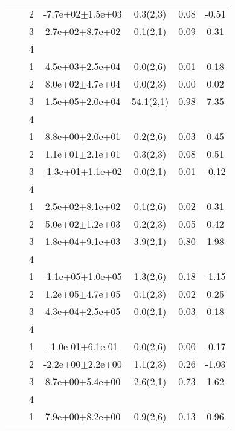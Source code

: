 \begin{longtable}[H]{llccccS[table-format=-2.2, table-space-text-post = {***}]}
   &  & 2 & -7.7e+02$\pm$1.5e+03 & 0.3(2,3) & 0.08 & -0.51 \\* 
   &  & 3 &  2.7e+02$\pm$8.7e+02 & 0.1(2,1) & 0.09 & 0.31 \\* 
   &  & 4 &  &  &  &  \\
   \midrule
{} & {} & 1 &  4.5e+03$\pm$2.5e+04 & 0.0(2,6) & 0.01 & 0.18 \\* 
   &  & 2 &  8.0e+02$\pm$4.7e+04 & 0.0(2,3) & 0.00 & 0.02 \\* 
   &  & 3 &  1.5e+05$\pm$2.0e+04 & 54.1(2,1) & 0.98 & 7.35 \\* 
   &  & 4 &  &  &  &  \\
   \midrule
{} & {} & 1 &  8.8e+00$\pm$2.0e+01 & 0.2(2,6) & 0.03 & 0.45 \\* 
   &  & 2 &  1.1e+01$\pm$2.1e+01 & 0.3(2,3) & 0.08 & 0.51 \\* 
   &  & 3 & -1.3e+01$\pm$1.1e+02 & 0.0(2,1) & 0.01 & -0.12 \\* 
   &  & 4 &  &  &  &  \\
   \midrule
{} & {} & 1 &  2.5e+02$\pm$8.1e+02 & 0.1(2,6) & 0.02 & 0.31 \\* 
   &  & 2 &  5.0e+02$\pm$1.2e+03 & 0.2(2,3) & 0.05 & 0.42 \\* 
   &  & 3 &  1.8e+04$\pm$9.1e+03 & 3.9(2,1) & 0.80 & 1.98 \\* 
   &  & 4 &  &  &  &  \\
   \midrule
{} & {} & 1 & -1.1e+05$\pm$1.0e+05 & 1.3(2,6) & 0.18 & -1.15 \\* 
   &  & 2 &  1.2e+05$\pm$4.7e+05 & 0.1(2,3) & 0.02 & 0.25 \\* 
   &  & 3 &  4.3e+04$\pm$2.5e+05 & 0.0(2,1) & 0.03 & 0.18 \\* 
   &  & 4 &  &  &  &  \\
   \midrule
{} & {} & 1 & -1.0e-01$\pm$6.1e-01 & 0.0(2,6) & 0.00 & -0.17 \\* 
   &  & 2 & -2.2e+00$\pm$2.2e+00 & 1.1(2,3) & 0.26 & -1.03 \\* 
   &  & 3 &  8.7e+00$\pm$5.4e+00 & 2.6(2,1) & 0.73 & 1.62 \\* 
   &  & 4 &  &  &  &  \\
   \midrule
{} & {} & 1 &  7.9e+00$\pm$8.2e+00 & 0.9(2,6) & 0.13 & 0.96 \\* 

\end{longtable}
